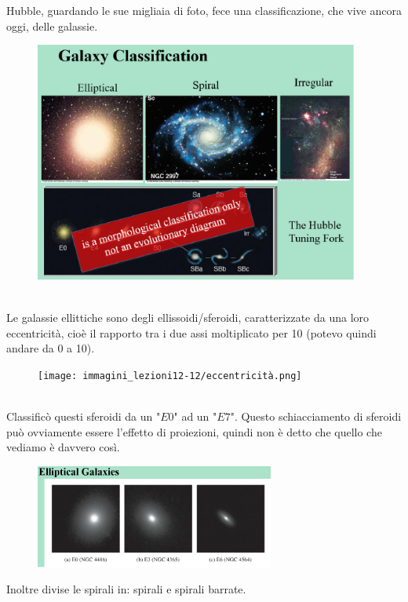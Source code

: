 \documentclass[a4paper,11pt]{article}
\begin{document}
Hubble, guardando le sue migliaia di foto, fece una classificazione, che vive ancora oggi, delle galassie. 
\begin{figure} [h]
        \centering
        \includegraphics[width=0.95\textwidth]{immagini_lezioni12-12/classificazione galassie.png}
        \label{}
    \end{figure}\\
Le galassie ellittiche sono degli ellissoidi/sferoidi, caratterizzate da una loro eccentricità, cioè il rapporto tra i due assi moltiplicato per 10 (potevo quindi andare da 0 a 10).
\begin{figure} [h]
        \centering
        \texttt{[image: immagini\_lezioni12-12/eccentricità.png]}
        \label{}
    \end{figure}\\
Classificò questi sferoidi da un "$E0$" ad un "$E7$". Questo schiacciamento di sferoidi può ovviamente essere l'effetto di proiezioni, quindi non è detto che quello che vediamo è davvero così.
\begin{figure} [h]
        \centering
        \includegraphics[width=0.7\textwidth]{immagini_lezioni12-12/galassie ellittiche.png}
        \label{}
    \end{figure}   
Inoltre divise le spirali in: spirali e spirali barrate.
\end{document}
